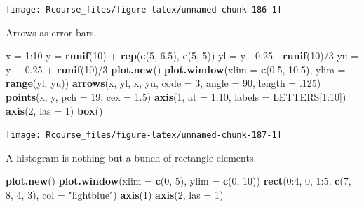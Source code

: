\documentclass[]{book}
\newenvironment{Shaded}{\begin{snugshade}}{\end{snugshade}}
\newcommand{\KeywordTok}[1]{\textcolor[rgb]{0.13,0.29,0.53}{\textbf{{#1}}}}
\newcommand{\DataTypeTok}[1]{\textcolor[rgb]{0.13,0.29,0.53}{{#1}}}
\newcommand{\DecValTok}[1]{\textcolor[rgb]{0.00,0.00,0.81}{{#1}}}
\newcommand{\FloatTok}[1]{\textcolor[rgb]{0.00,0.00,0.81}{{#1}}}
\newcommand{\StringTok}[1]{\textcolor[rgb]{0.31,0.60,0.02}{{#1}}}
\newcommand{\NormalTok}[1]{{#1}}
\theoremstyle{definition}
\theoremstyle{definition}
\theoremstyle{remark}
\begin{document}
\texttt{[image: Rcourse\_files/figure-latex/unnamed-chunk-186-1]}

Arrows as error bars.

\begin{Shaded}
\begin{Highlighting}[]
\NormalTok{x =}\StringTok{ }\DecValTok{1}\NormalTok{:}\DecValTok{10}
\NormalTok{y =}\StringTok{ }\KeywordTok{runif}\NormalTok{(}\DecValTok{10}\NormalTok{) +}\StringTok{ }\KeywordTok{rep}\NormalTok{(}\KeywordTok{c}\NormalTok{(}\DecValTok{5}\NormalTok{, }\FloatTok{6.5}\NormalTok{), }\KeywordTok{c}\NormalTok{(}\DecValTok{5}\NormalTok{, }\DecValTok{5}\NormalTok{))}
\NormalTok{yl =}\StringTok{ }\NormalTok{y -}\StringTok{ }\FloatTok{0.25} \NormalTok{-}\StringTok{ }\KeywordTok{runif}\NormalTok{(}\DecValTok{10}\NormalTok{)/}\DecValTok{3}
\NormalTok{yu =}\StringTok{ }\NormalTok{y +}\StringTok{ }\FloatTok{0.25} \NormalTok{+}\StringTok{ }\KeywordTok{runif}\NormalTok{(}\DecValTok{10}\NormalTok{)/}\DecValTok{3}
\KeywordTok{plot.new}\NormalTok{()}
\KeywordTok{plot.window}\NormalTok{(}\DataTypeTok{xlim =} \KeywordTok{c}\NormalTok{(}\FloatTok{0.5}\NormalTok{, }\FloatTok{10.5}\NormalTok{), }\DataTypeTok{ylim =} \KeywordTok{range}\NormalTok{(yl, yu))}
\KeywordTok{arrows}\NormalTok{(x, yl, x, yu, }\DataTypeTok{code =} \DecValTok{3}\NormalTok{, }\DataTypeTok{angle =} \DecValTok{90}\NormalTok{, }\DataTypeTok{length =} \NormalTok{.}\DecValTok{125}\NormalTok{)}
\KeywordTok{points}\NormalTok{(x, y, }\DataTypeTok{pch =} \DecValTok{19}\NormalTok{, }\DataTypeTok{cex =} \FloatTok{1.5}\NormalTok{)}
\KeywordTok{axis}\NormalTok{(}\DecValTok{1}\NormalTok{, }\DataTypeTok{at =} \DecValTok{1}\NormalTok{:}\DecValTok{10}\NormalTok{, }\DataTypeTok{labels =} \NormalTok{LETTERS[}\DecValTok{1}\NormalTok{:}\DecValTok{10}\NormalTok{])}
\KeywordTok{axis}\NormalTok{(}\DecValTok{2}\NormalTok{, }\DataTypeTok{las =} \DecValTok{1}\NormalTok{)}
\KeywordTok{box}\NormalTok{()}
\end{Highlighting}
\end{Shaded}

\texttt{[image: Rcourse\_files/figure-latex/unnamed-chunk-187-1]}

A histogram is nothing but a bunch of rectangle elements.

\begin{Shaded}
\begin{Highlighting}[]
\KeywordTok{plot.new}\NormalTok{()}
\KeywordTok{plot.window}\NormalTok{(}\DataTypeTok{xlim =} \KeywordTok{c}\NormalTok{(}\DecValTok{0}\NormalTok{, }\DecValTok{5}\NormalTok{), }\DataTypeTok{ylim =} \KeywordTok{c}\NormalTok{(}\DecValTok{0}\NormalTok{, }\DecValTok{10}\NormalTok{))}
\KeywordTok{rect}\NormalTok{(}\DecValTok{0}\NormalTok{:}\DecValTok{4}\NormalTok{, }\DecValTok{0}\NormalTok{, }\DecValTok{1}\NormalTok{:}\DecValTok{5}\NormalTok{, }\KeywordTok{c}\NormalTok{(}\DecValTok{7}\NormalTok{, }\DecValTok{8}\NormalTok{, }\DecValTok{4}\NormalTok{, }\DecValTok{3}\NormalTok{), }\DataTypeTok{col =} \StringTok{"lightblue"}\NormalTok{)}
\KeywordTok{axis}\NormalTok{(}\DecValTok{1}\NormalTok{)}
\KeywordTok{axis}\NormalTok{(}\DecValTok{2}\NormalTok{, }\DataTypeTok{las =} \DecValTok{1}\NormalTok{)}
\end{Highlighting}
\end{Shaded}
\end{document}
